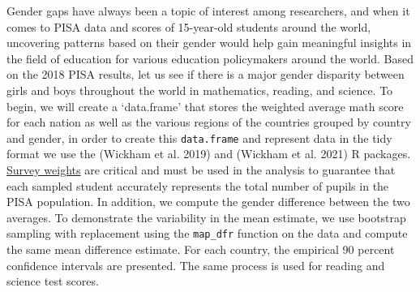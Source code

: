 Gender gaps have always been a topic of interest among researchers, and when it comes to PISA data and scores of 15-year-old students around the world, uncovering patterns based on their gender would help gain meaningful insights in the field of education for various education policymakers around the world. Based on the 2018 PISA results, let us see if there is a major gender disparity between girls and boys throughout the world in mathematics, reading, and science. To begin, we will create a `data.frame' that stores the weighted average math score for each nation as well as the various regions of the countries grouped by country and gender, in order to create this \texttt{data.frame} and represent data in the tidy format we use the  (Wickham et al. 2019) and  (Wickham et al. 2021) R packages. \href{https://www.oecd.org/pisa/data/2015-technical-report/PISA-2015-Technical-Report-Chapter-8-Survey-Weighting.pdf}{Survey weights} are critical and must be used in the analysis to guarantee that each sampled student accurately represents the total number of pupils in the PISA population. In addition, we compute the gender difference between the two averages. To demonstrate the variability in the mean estimate, we use bootstrap sampling with replacement using the \texttt{map\_dfr} function on the data and compute the same mean difference estimate. For each country, the empirical 90 percent confidence intervals are presented. The same process is used for reading and science test scores.

